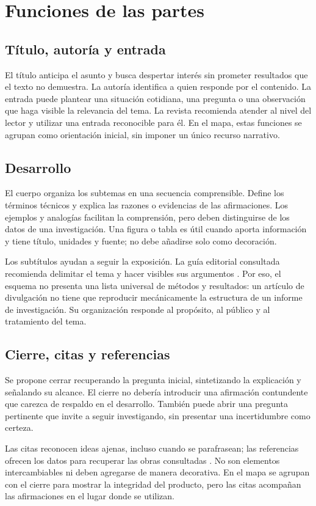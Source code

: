 \section{Funciones de las partes}
\subsection{Título, autoría y entrada}
El título anticipa el asunto y busca despertar interés sin prometer resultados que el texto no demuestra. La autoría identifica a quien responde por el contenido. La entrada puede plantear una situación cotidiana, una pregunta o una observación que haga visible la relevancia del tema. La revista \textcite{comovesautores} recomienda atender al nivel del lector y utilizar una entrada reconocible para él. En el mapa, estas funciones se agrupan como orientación inicial, sin imponer un único recurso narrativo.

\subsection{Desarrollo}
El cuerpo organiza los subtemas en una secuencia comprensible. Define los términos técnicos y explica las razones o evidencias de las afirmaciones. Los ejemplos y analogías facilitan la comprensión, pero deben distinguirse de los datos de una investigación. Una figura o tabla es útil cuando aporta información y tiene título, unidades y fuente; no debe añadirse solo como decoración.

Los subtítulos ayudan a seguir la exposición. La guía editorial consultada recomienda delimitar el tema y hacer visibles sus argumentos \parencite{comovesautores}. Por eso, el esquema no presenta una lista universal de métodos y resultados: un artículo de divulgación no tiene que reproducir mecánicamente la estructura de un informe de investigación. Su organización responde al propósito, al público y al tratamiento del tema.

\subsection{Cierre, citas y referencias}
Se propone cerrar recuperando la pregunta inicial, sintetizando la explicación y señalando su alcance. El cierre no debería introducir una afirmación contundente que carezca de respaldo en el desarrollo. También puede abrir una pregunta pertinente que invite a seguir investigando, sin presentar una incertidumbre como certeza.

Las citas reconocen ideas ajenas, incluso cuando se parafrasean; las referencias ofrecen los datos para recuperar las obras consultadas \parencite{guiaapa}. No son elementos intercambiables ni deben agregarse de manera decorativa. En el mapa se agrupan con el cierre para mostrar la integridad del producto, pero las citas acompañan las afirmaciones en el lugar donde se utilizan.

